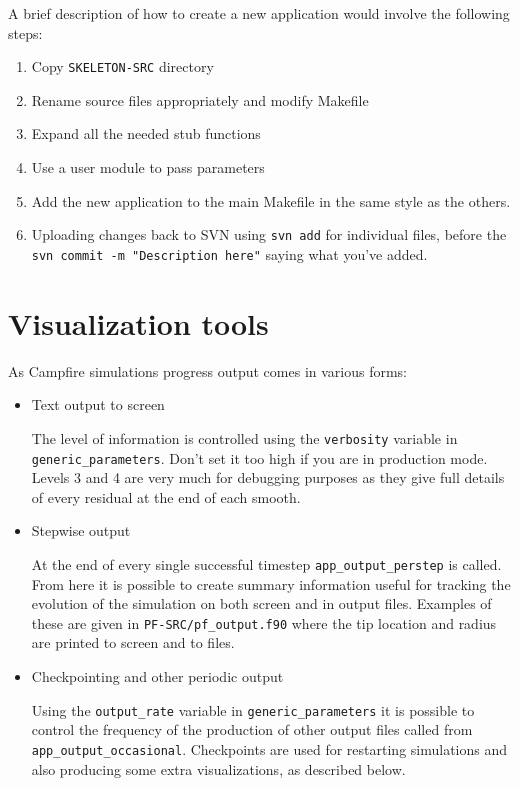 \documentclass[paper=a4, fontsize=11pt,twoside,bibtotoc]{scrartcl}		%
\begin{document}
A brief description of how to create a new application would involve the following steps:
\begin{enumerate}
	\item{Copy \texttt{SKELETON-SRC} directory}
	\item{Rename source files appropriately and modify Makefile}
	\item{Expand all the needed stub functions}
	\item{Use a user module to pass parameters}
	\item{Add the new application to the main Makefile in the same style as the others.}
	\item{Uploading changes back to SVN using \texttt{svn~add} for individual files, before the \texttt{svn~commit -m "Description here"} saying what 
		you've added.}
\end{enumerate}


\section{Visualization tools}
								\label{SEC_Viz}

As Campfire simulations progress output comes in various forms:

\begin{itemize}
	\item{Text output to screen

	The level of information is controlled using the \texttt{verbosity} variable in \texttt{generic\_parameters}.  Don't set it too high if you are in 
	production mode.  Levels 3 and 4 are very much for debugging purposes as they give full details of every residual at the end of each smooth.}

	\item{Stepwise output

	At the end of every single successful timestep \texttt{app\_output\_perstep} is called.  From here it is possible to create summary information useful 
	for tracking the evolution of the simulation on both screen and in output files.  Examples of these are given in \texttt{PF-SRC/pf\_output.f90} where the 
	tip location and radius are printed to screen and to files.
	}

	\item{Checkpointing and other periodic output

	Using the \texttt{output\_rate} variable in \texttt{generic\_parameters} it is possible to control the frequency of the production of other output files   
	called from \texttt{app\_output\_occasional}.
	Checkpoints are used for restarting simulations and also producing some extra visualizations, as described below.}

\end{itemize}
\end{document}
